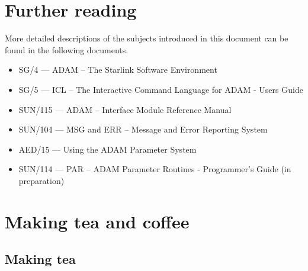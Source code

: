 \documentclass[twoside,11pt]{article}
\newcommand{\xref}[3]{#1}
\newcommand{\xlabel}[1]{}
\renewcommand{\_}{\texttt{\symbol{95}}}
\begin{document}
\section{Further reading\xlabel{further_reading}}

More detailed descriptions of the subjects introduced in this document
can be found in the following documents.
\begin{itemize}
\item \xref{SG/4}{sg4}{} --- ADAM -- The Starlink Software Environment
\item \xref{SG/5}{sg5}{} --- ICL -- The Interactive Command Language for ADAM - Users Guide
\item \xref{SUN/115}{sun115}{} --- ADAM --  Interface Module Reference Manual
\item \xref{SUN/104}{sun104}{} --- MSG and ERR -- Message and Error Reporting System
\item AED/15 --- Using the ADAM Parameter System
\item \xref{SUN/114}{sun114}{} --- PAR -- ADAM Parameter Routines - Programmer's Guide
(in preparation)
\end{itemize}

\appendix
\newpage

\section{Making tea and coffee\xlabel{making_tea_and_coffee}\label{make}}

\subsection{Making tea}
\end{document}
